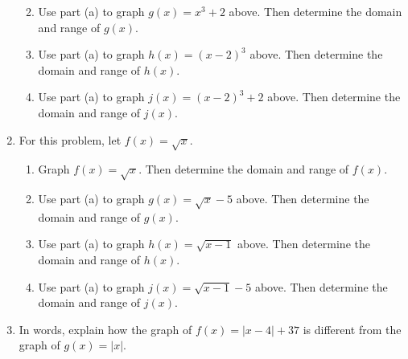 \begin{enumerate}
\begin{enumerate}
\begin{tikzpicture}[y=.5cm, x=0.5cm,font=\sffamily]
  \end{tikzpicture}

\item Use part (a) to graph $g(x)=x^3+2$ above.  Then determine the domain and range of $g(x)$.
\vfill
\item Use part (a) to graph $h(x)=(x-2)^3$ above.  Then determine the domain and range of $h(x)$.
\vfill
\item Use part (a) to graph $j(x)=(x-2)^3+2$ above.  Then determine the domain and range of $j(x)$.
\vfill
\end{enumerate}




\newpage

\item  For this problem, let $f(x)=\sqrt{x}$.

\begin{enumerate}
\item Graph $f(x)=\sqrt{x}$.  Then determine the domain and range of $f(x)$.\\

\item Use part (a) to graph $g(x)=\sqrt{x}-5$ above.  Then determine the domain and range of $g(x)$.
\vfill
\item Use part (a) to graph $h(x)=\sqrt{x-1}$ above.  Then determine the domain and range of $h(x)$.
\vfill
\item Use part (a) to graph $j(x)=\sqrt{x-1}-5$ above.  Then determine the domain and range of $j(x)$.
\vfill
\end{enumerate}


\newpage

\item In words, explain how the graph of $f(x)=|x-4|+37$ is different from the graph of $g(x)=|x|$.
\vfill


\end{enumerate}
